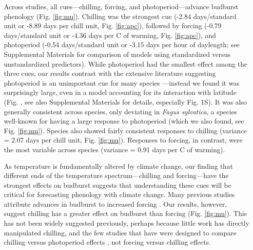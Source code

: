 \documentclass{article}
\begin{document}
\par Across studies, all cues---chilling, forcing, and photoperiod---advance budburst phenology (Fig. \ref {fig:mu}). Chilling was the strongest cue (-2.84 days/standard unit or -8.89 days per chill unit, Fig. \ref {fig:apc}), followed by forcing (-0.79 days/standard unit or -4.36 days per \degree C of warming, Fig. \ref {fig:apc}), and photoperiod (-0.54 days/standard unit or -3.15 days per hour of daylength; see Supplemental Materials for comparison of models using standardized versus unstandardized predictors). While photoperiod had the smallest effect among the three cues, our results contrast with the extensive literature suggesting photoperiod is an unimportant cue for many species \citep{zohner2016,koerner2010a}---instead we found it was surprisingly large, even in a model accounting for its interaction with latitude (Fig. , see also Supplemental Materials for details, especially Fig. 1S). It was also generally consistent across species, only deviating in  \emph{Fagus sylvatica}, a species well-known for having a large response to photoperiod (which we also found, see Fig. \ref {fig:mu}). Species also showed fairly consistent responses to chilling (variance = 2.07 days per chill unit, Fig. \ref {fig:mu}).
Responses to forcing, in contrast, were the most variable across species (variance = 0.91 days per \degree C of warming).

\par As temperature is fundamentally altered by climate change, our finding that different ends of the temperature spectrum---chilling and forcing---have the strongest effects on budburst suggests that understanding these cues will be critical for forecasting phenology with climate change. Many previous studies attribute advances in budburst to increased forcing \citep{Basler:2014aa,bradley1999,menzel2006,harrington2015}. %
Our results, however, suggest chilling has a greater effect on budburst than forcing (Fig. \ref{fig:mu}). This has not been widely suggested previously, perhaps because little work has directly manipulated chilling, and the few studies that have were designed to compare chilling versus photoperiod effects \citep[e.g., ][]{Basler:2014aa,Caffarra:2011qf,Laube:2014a,zohner2016}, not forcing versus chilling effects. 
\end{document}
